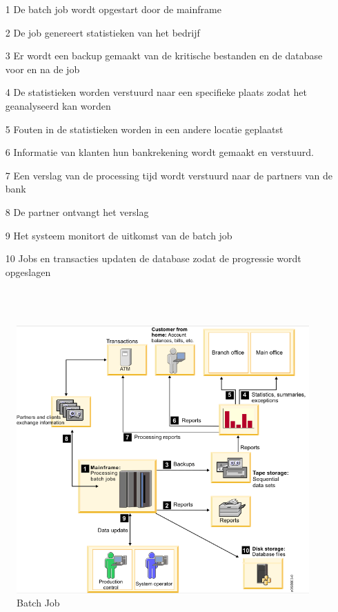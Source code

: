 \begin{itemize}
    \item[1] De batch job wordt opgestart door de mainframe
    \item[2] De job genereert statistieken van het bedrijf
    \item[3] Er wordt een backup gemaakt van de kritische bestanden en de database voor en na de job
    \item[4] De statistieken worden verstuurd naar een specifieke plaats zodat het geanalyseerd kan worden
    \item[5] Fouten in de statistieken worden in een andere locatie geplaatst
    \item[6] Informatie van klanten hun bankrekening wordt gemaakt en verstuurd.
    \item[7] Een verslag van de processing tijd wordt verstuurd naar de partners van de bank
    \item[8] De partner ontvangt het verslag
    \item[9] Het systeem monitort de uitkomst van de batch job
    \item[10] Jobs en transacties updaten de database zodat de progressie wordt opgeslagen
\end{itemize}
\\ \\
\begin{figure}[p!]
    \centering
    \includegraphics[width=400pt]{./graphics/BatchJobVB.png}
    \caption{Batch Job \autocite{IBMb}}
    \label{fig:batch}
\end{figure}

